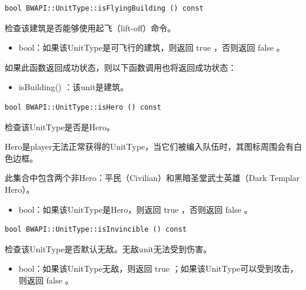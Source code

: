 \begin{tcolorbox}[colback=white, colframe=black!60!white, title=isFlyingBuilding(), arc=0mm]
    \begin{verbatim}
bool BWAPI::UnitType::isFlyingBuilding () const
    \end{verbatim}
    检查该建筑是否能够使用起飞（lift-off）命令。
\begin{return}
\begin{itemize}
    \item bool：如果该UnitType是可飞行的建筑，则返回   true  ，否则返回   false  。
\end{itemize}
\end{return}
\begin{note}
    如果此函数返回成功状态，则以下函数调用也将返回成功状态：
    \begin{itemize}
        \item isBuilding()  ：该unit是建筑。
    \end{itemize}
\end{note}
\end{tcolorbox}



\begin{tcolorbox}[colback=white, colframe=black!60!white, title=isHero(), arc=0mm]
    \begin{verbatim}
bool BWAPI::UnitType::isHero () const
    \end{verbatim}
    检查该UnitType是否是Hero。\par Hero是player无法正常获得的UnitType，当它们被编入队伍时，其图标周围会有白色边框。
\begin{note}
    此集合中包含两个非Hero：平民（Civilian）和黑暗圣堂武士英雄（Dark Templar Hero）。
\end{note}
    \begin{return}
\begin{itemize}
    \item bool：如果该UnitType是Hero，则返回   true  ，否则返回   false  。
\end{itemize}
\end{return}
\end{tcolorbox}


\begin{tcolorbox}[colback=white, colframe=black!60!white, title=isInvincible(), arc=0mm]
    \begin{verbatim}
bool BWAPI::UnitType::isInvincible () const
    \end{verbatim}
    检查该UnitType是否默认无敌。无敌unit无法受到伤害。
\begin{return}
\begin{itemize}
    \item bool：如果该UnitType无敌，则返回   true  ；如果该UnitType可以受到攻击，则返回   false  。
\end{itemize}
\end{return}
\end{tcolorbox}


